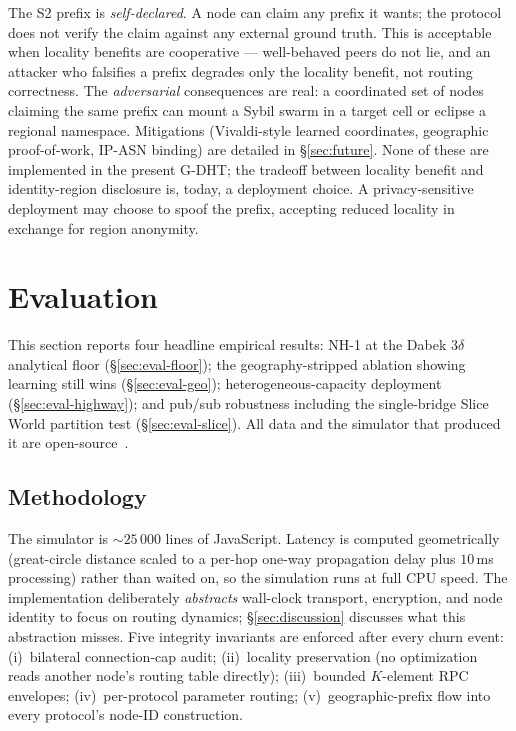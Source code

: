 \documentclass[conference]{IEEEtran}
\newcommand{\nhone}{NH-1\xspace}
\newcommand{\GDHT}{G-DHT\xspace}
\begin{document}
The S2 prefix is \emph{self-declared}. A node can claim any prefix it
wants; the protocol does not verify the claim against any external
ground truth. This is acceptable when locality benefits are
cooperative --- well-behaved peers do not lie, and an attacker who
falsifies a prefix degrades only the locality benefit, not routing
correctness. The \emph{adversarial} consequences are real: a
coordinated set of nodes claiming the same prefix can mount a Sybil
swarm in a target cell or eclipse a regional namespace. Mitigations
(Vivaldi-style learned coordinates, geographic proof-of-work, IP-ASN
binding) are detailed in \S\ref{sec:future}. None of these are
implemented in the present \GDHT; the tradeoff between locality
benefit and identity-region disclosure is, today, a deployment
choice. A privacy-sensitive deployment may choose to spoof the
prefix, accepting reduced locality in exchange for region anonymity.

\section{Evaluation}
\label{sec:eval}

This section reports four headline empirical results: \nhone at the
Dabek $3\delta$ analytical floor (\S\ref{sec:eval-floor}); the
geography-stripped ablation showing learning still wins
(\S\ref{sec:eval-geo}); heterogeneous-capacity deployment
(\S\ref{sec:eval-highway}); and pub/sub robustness including the
single-bridge Slice World partition test (\S\ref{sec:eval-slice}). All
data and the simulator that produced it are open-source~\cite{dhtsim2026}.

\subsection{Methodology}
\label{sec:eval-method}

The simulator is $\sim\!25\,000$ lines of JavaScript. Latency is computed
geometrically (great-circle distance scaled to a per-hop one-way
propagation delay plus $10$\,ms processing) rather than waited on, so
the simulation runs at full CPU speed. The implementation deliberately
\emph{abstracts} wall-clock transport, encryption, and node identity
to focus on routing dynamics; \S\ref{sec:discussion} discusses what
this abstraction misses. Five integrity invariants are enforced after
every churn event: (i)~bilateral connection-cap audit; (ii)~locality
preservation (no optimization reads another node's routing table
directly); (iii)~bounded $K$-element RPC envelopes; (iv)~per-protocol
parameter routing; (v)~geographic-prefix flow into every protocol's
node-ID construction.
\end{document}

